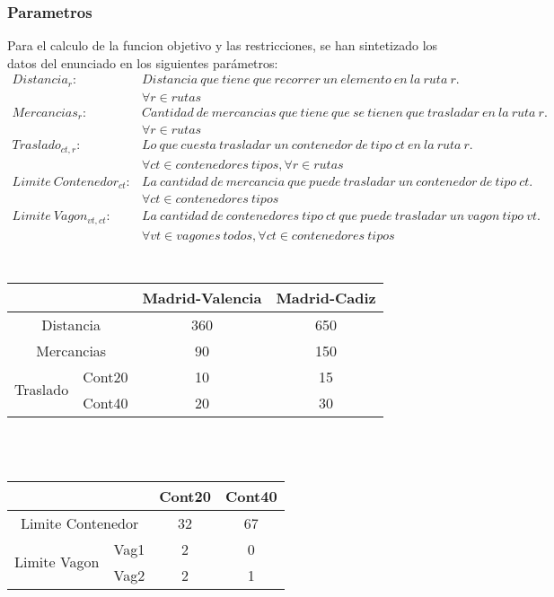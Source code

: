 \documentclass[11pt,spanish]{article}
\begin{document}
			\subsubsection{Parametros}
			Para el calculo de la funcion objetivo y las restricciones, se han sintetizado los datos del enunciado en los siguientes parámetros:
			\begin{align*}
				Distancia_r:& Distancia\ que\ tiene\ que\ recorrer\ un\ elemento\ en\ la\ ruta\ r.\\
				&\forall r \in rutas\\
				Mercancias_r:& Cantidad\ de\ mercancias\ que\ tiene\ que\ se\ tienen\ que\ trasladar\ en\ la\ ruta\ r.\\
				&\forall r \in rutas\\
				Traslado_{ct,r}:& Lo\ que\ cuesta\ trasladar\ un\ contenedor\ de\ tipo\ ct\ en\ la\ ruta\ r.\\
				&\forall ct \in contenedores\ tipos, \forall r \in rutas \\
				Limite\ Contenedor_{ct}:& La\ cantidad\ de\ mercancia\ que\ puede\ trasladar\ un\ contenedor\ de\ tipo\ ct.\\
				&\forall ct \in contenedores\ tipos\\
				Limite\ Vagon_{vt,ct}:& La\ cantidad\ de\ contenedores\ tipo\ ct\ que\ puede\ trasladar\ un\ vagon\ tipo\ vt.\\
				&\forall vt \in vagones\ todos, \forall ct \in contenedores\ tipos\\
			\end{align*}
			\\
			\label{tab:params2rut}
			\begin{tabular}{ |c|c||c|c|  }
				\hline
				\multicolumn{2}{|c||}{}& Madrid-Valencia & Madrid-Cadiz \\
				\hline
				\multicolumn{2}{|c||}{Distancia} & 360 & 650\\
				\multicolumn{2}{|c||}{Mercancias} & 90 & 150\\
				\multirow{2}{*}{Traslado} & Cont20 & 10 & 15\\
				& Cont40 & 20 & 30\\
				\hline
			\end{tabular}
			\\
			\\
			\label{tab:params2cont}
			\begin{tabular}{ |c|c||c|c|  }
				\hline
				\multicolumn{2}{|c||}{}& Cont20 & Cont40 \\
				\hline
				\multicolumn{2}{|c||}{Limite Contenedor} & 32 & 67\\
				\multirow{2}{*}{Limite Vagon} & Vag1 & 2 & 0\\
				& Vag2 & 2 & 1\\
				\hline
			\end{tabular}
\end{document}
